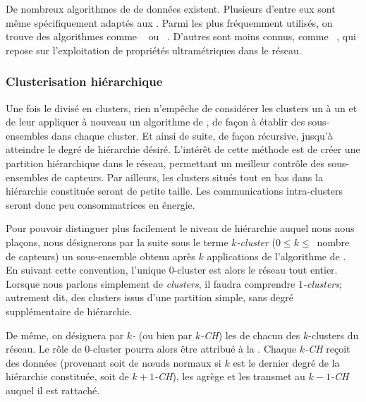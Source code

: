 De nombreux algorithmes de  de données existent.
Plusieurs d'entre eux sont même spécifiquement adaptés aux \rcsfs.
Parmi les plus fréquemment utilisés, on trouve des algorithmes comme \leach~\cite{HCB00} ou \heed~\cite{YF04}.
D'autres sont moins connus, comme \ffuca~\cite{FL11}, qui repose sur l'exploitation de propriétés ultramétriques dans le réseau.

        \subsubsection{Clusterisation hiérarchique}
Une fois le \rc divisé en clusters, rien n'empêche de considérer les clusters un à un et de leur appliquer à nouveau un algorithme de , de façon à établir des sous-ensembles dans chaque cluster.
Et ainsi de suite, de façon récursive, jusqu'à atteindre le degré de hiérarchie désiré.
L'intérêt de cette méthode est de créer une partition hiérarchique dans le réseau, permettant un meilleur contrôle des sous-ensembles de capteurs.
Par ailleurs, les clusters situés tout en bas dans la hiérarchie constituée seront de petite taille.
Les communications intra-clusters seront donc peu consommatrices en énergie.

Pour pouvoir distinguer plus facilement le niveau de hiérarchie auquel nous nous plaçons, nous désignerons par la suite sous le terme \textit{$k$-cluster} ($0 \leq k \leq$~nombre de capteurs) un sous-ensemble obtenu après $k$ applications de l'algorithme de .
En suivant cette convention, l'unique $0$-cluster est alors le réseau tout entier.
Lorsque nous parlons simplement de \textit{clusters}, il faudra comprendre \textit{$1$-clusters}; autrement dit, des clusters issus d'une partition simple, sans degré supplémentaire de hiérarchie.

De même, on désignera par \textit{$k$-\ch} (ou bien par \textit{$k$-CH}) les \chs de chacun des $k$-clusters du réseau.
Le rôle de $0$-cluster pourra alors être attribué à la \sdb.
Chaque \textit{$k$-CH} reçoit des données (provenant soit de nœuds normaux si $k$ est le dernier degré de la hiérarchie constituée, soit de \textit{$k+1$-CH}), les agrège et les transmet au \textit{$k-1$-CH} auquel il est rattaché.

